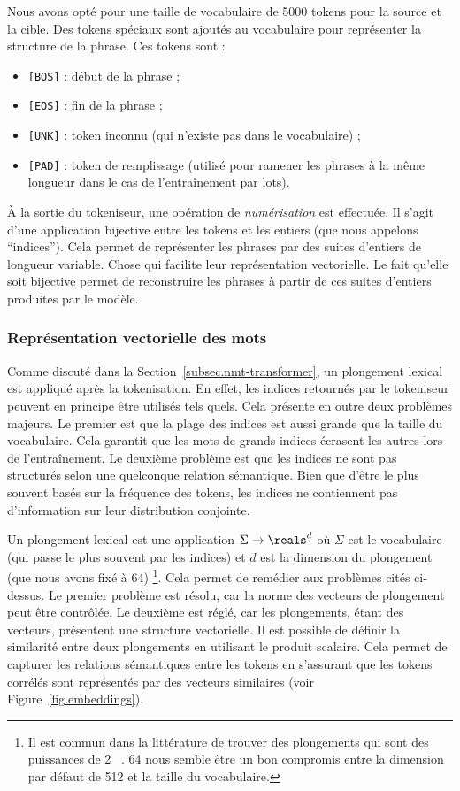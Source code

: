 Nous avons opté pour une taille de vocabulaire de 5000 tokens pour la source et la cible.
Des tokens spéciaux sont ajoutés au vocabulaire pour représenter la structure de la phrase.
Ces tokens sont :
\begin{itemize}
    \item \texttt{[BOS]} : début de la phrase ;
    \item \texttt{[EOS]} : fin de la phrase ;
    \item \texttt{[UNK]} : token inconnu (qui n'existe pas dans le vocabulaire) ;
    \item \texttt{[PAD]} : token de remplissage (utilisé pour ramener les phrases à la même longueur 
    dans le cas de l'entraînement par lots).
\end{itemize}

À la sortie du tokeniseur, une opération de \emph{numérisation} est effectuée.
Il s'agit d'une application bijective entre les tokens et les entiers (que nous appelons ``indices'').
Cela permet de représenter les phrases par des suites d'entiers de longueur variable.
Chose qui facilite leur représentation vectorielle.
Le fait qu'elle soit bijective permet de reconstruire les phrases 
à partir de ces suites d'entiers produites par le modèle.

\subsubsection{Représentation vectorielle des mots}

Comme discuté dans la Section~\ref{subsec.nmt-transformer},
un plongement lexical est appliqué après la tokenisation.
En effet, les indices retournés par le tokeniseur peuvent en principe être utilisés tels quels.
Cela présente en outre deux problèmes majeurs.
Le premier est que la plage des indices est aussi grande que la taille du vocabulaire.
Cela garantit que les mots de grands indices écrasent les autres lors de l'entraînement.
Le deuxième problème est que les indices ne sont pas structurés selon une quelconque relation sémantique.
Bien que d'être le plus souvent basés sur la fréquence des tokens, 
les indices ne contiennent pas d'information sur leur distribution conjointe.

Un plongement lexical est une application \(\Sigma \to \reals^d\) où \(\Sigma\) est le vocabulaire 
(qui passe le plus souvent par les indices) et \(d\) est la dimension du plongement (que nous avons fixé à 64)%
\footnote{Il est commun dans la littérature de trouver des plongements qui sont des puissances de 2%
~\cite{attention,Paszke_et_al_2019}. 
64 nous semble être un bon compromis entre la dimension par défaut de 512 et la taille du vocabulaire.}.
Cela permet de remédier aux problèmes cités ci-dessus.
Le premier problème est résolu, car la norme des vecteurs de plongement peut être contrôlée.
Le deuxième est réglé, car les plongements, étant des vecteurs, présentent une structure vectorielle.
Il est possible de définir la similarité entre deux plongements en utilisant le produit scalaire.
Cela permet de capturer les relations sémantiques entre les tokens en s'assurant que les tokens corrélés
sont représentés par des vecteurs similaires (voir Figure~\ref{fig.embeddings}).

